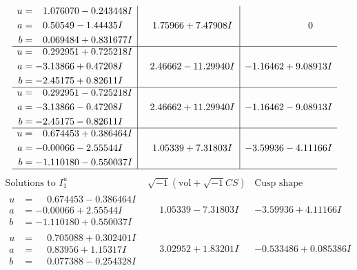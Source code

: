 \documentclass[1p]{elsarticle_modified}
\theoremstyle{definition}
\newcommand{\I}{\sqrt{-1}}
\begin{document}
$$\begin{array}{c|c|c}
\begin{aligned}
u &= \phantom{-}1.076070 - 0.243448 I \\
a &= \phantom{-}0.50549 - 1.44435 I \\
b &= \phantom{-}0.069484 + 0.831677 I\end{aligned}
 & \phantom{-}1.75966 + 7.47908 I & \phantom{-0.000000 } 0 \\ \hline\begin{aligned}
u &= \phantom{-}0.292951 + 0.725218 I \\
a &= -3.13866 + 0.47208 I \\
b &= -2.45175 + 0.82611 I\end{aligned}
 & \phantom{-}2.46662 - 11.29940 I & -1.16462 + 9.08913 I \\ \hline\begin{aligned}
u &= \phantom{-}0.292951 - 0.725218 I \\
a &= -3.13866 - 0.47208 I \\
b &= -2.45175 - 0.82611 I\end{aligned}
 & \phantom{-}2.46662 + 11.29940 I & -1.16462 - 9.08913 I \\ \hline\begin{aligned}
u &= \phantom{-}0.674453 + 0.386464 I \\
a &= -0.00066 - 2.55544 I \\
b &= -1.110180 - 0.550037 I\end{aligned}
 & \phantom{-}1.05339 + 7.31803 I & -3.59936 - 4.11166 I\\
 \hline 
 \end{array}$$\newpage$$\begin{array}{c|c|c}  
\text{Solutions to }I^u_{1}& \I (\text{vol} + \sqrt{-1}CS) & \text{Cusp shape}\\
 \hline 
\begin{aligned}
u &= \phantom{-}0.674453 - 0.386464 I \\
a &= -0.00066 + 2.55544 I \\
b &= -1.110180 + 0.550037 I\end{aligned}
 & \phantom{-}1.05339 - 7.31803 I & -3.59936 + 4.11166 I \\ \hline\begin{aligned}
u &= \phantom{-}0.705088 + 0.302401 I \\
a &= \phantom{-}0.83956 + 1.15317 I \\
b &= \phantom{-}0.077388 - 0.254328 I\end{aligned}
 & \phantom{-}3.02952 + 1.83201 I & -0.533486 + 0.085386 I \\ \hline\begin{aligned}

\end{aligned}
\end{array}$$
\end{document}
